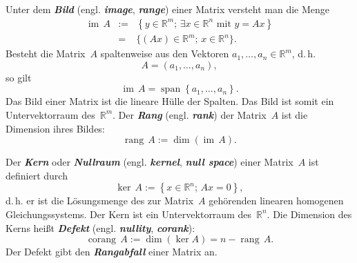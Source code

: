 \documentclass[a4paper,twoside,english,ngerman,deutsch,german,sectrefs,envcountsame,envcountchap]{svmono}
\begin{document}
Unter dem \textbf{\em Bild} (engl. \textbf{\em image}, \textbf{\em range}) einer Matrix versteht man die Menge
\[
\begin{array}{lrl}
{\operatorname{im}}\,A & := & \left\{ y\in{\mathbb{R}}^{m};\,\exists x\in{\mathbb{R}}^{n}\textrm{ mit }y=Ax\right\} \\
 & = & \{(Ax)\in{\mathbb{R}}^{m};\,x\in{\mathbb{R}}^{n}\}.
\end{array}
\]
 Besteht die Matrix~$A$ spaltenweise aus den Vektoren $a_{1},\ldots,a_{n}\in{\mathbb{R}}^{m}$,
d.\,h.
\[
A=\left(a_{1},\ldots,a_{n}\right),
\]
so gilt
\[
{\operatorname{im}}\,A={\operatorname{span}}\left\{ a_{1},\ldots,a_{n}\right\} .
\]
Das Bild einer Matrix ist die lineare Hülle der Spalten. Das Bild ist somit ein Untervektorraum des~${\mathbb{R}}^{m}$. Der \textbf{\em Rang} (engl.
\textbf{\em rank}) der Matrix~$A$ ist die Dimension ihres Bildes:
\begin{equation}
{\operatorname{rang}}\,A:=\dim({\operatorname{im}}\,A).\label{eq:rank}
\end{equation}

Der \textbf{\em Kern} oder \textbf{\em Nullraum} (engl. \textbf{\em kernel}, \textbf{\em null space}) einer Matrix~$A$ ist definiert durch
\[
\ker\,A:=\left\{ x\in{\mathbb{R}}^{n};\,Ax=0\right\} ,
\]
d.\,h. er ist die Lösungsmenge des zur Matrix~$A$ gehörenden linearen homogenen Gleichungssystems. Der Kern ist ein Untervektorraum des~${\mathbb{R}}^{n}$. Die Dimension des Kerns heißt \textbf{\em Defekt} (engl. \textbf{\em nullity},
\textbf{\em corank}):
\begin{equation}
{\operatorname{corang}}\,A:=\dim(\ker A)=n-{\operatorname{rang}}\,A.\label{eq:corank}
\end{equation}
Der Defekt gibt den \textbf{\em Rangabfall} einer Matrix an.
\end{document}
